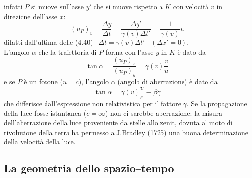 infatti $P$ si muove sull'asse $y'$ che si muove rispetto a $K$ con velocit\`a
$v$ in direzione dell'asse $x$;
\begin{equation}
  (u_P)_y=\frac{\Delta y}{\Delta t}
  =\frac{\Delta y'}{\gamma(v)\Delta t'}=\frac{1}{\gamma(v)}u
  \tag{4.54}
\end{equation}
difatti dall'ultima delle (4.40) \ $\Delta t=\gamma(v)\Delta t'$
\ $(\Delta x'=0)$.\\
L'angolo $\alpha$ che la traiettoria di $P$ forma con l'asse $y$ in $K$ \`e dato
da
\begin{equation}
  \tan\alpha=\frac{(u_P)_x}{(u_P)_y}=\gamma(v)\frac vu
  \tag{4.55}
\end{equation}
e se $P$ \`e un fotone ($u=c$), l'angolo $\alpha$ (angolo di aberrazione) \`e
dato da
\begin{equation}
  \tan\alpha=\gamma(v)\frac vc\equiv\beta\gamma
  \tag{4.56}
\end{equation}
che differisce dall'espressione non relativistica per il fattore $\gamma$. Se la
propagazione della luce fosse istantanea ($c=\infty$) non ci sarebbe
aberrazione: la misura dell'aberrazione della luce proveniente da stelle allo
zenit, dovuta al moto di rivoluzione della terra ha permesso a J.Bradley (1725)
una buona determinazione della velocit\`a della luce.

\subsection{La geometria dello spazio--tempo}

